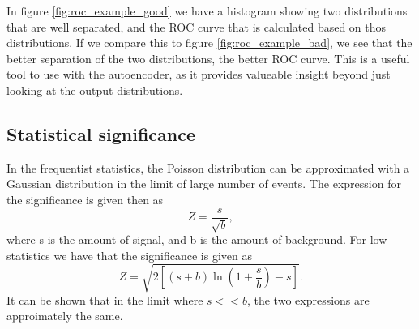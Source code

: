 In figure \ref{fig:roc_example_good} we have a histogram showing two distributions that are well separated, and the ROC curve that is calculated 
based on thos distributions. If we compare this to figure \ref{fig:roc_example_bad}, we see that the better separation of the two distributions, the better ROC curve. 
This is a useful tool to use with the autoencoder, as it provides valueable insight beyond just looking at the output distributions.

\subsection*{Statistical significance}
In the frequentist statistics, the Poisson distribution can be approximated with a Gaussian distribution in the limit of large number of events\cite{magnar}. 
The expression for the significance is given then as 
\begin{equation}\label{eq:significance_large}
    Z = \frac{s}{\sqrt{b}},
\end{equation}
where s is the amount of signal, and b is the amount of background. For low statistics we have that the significance is given as 
\begin{equation}\label{eq:significance_small}
    Z = \sqrt{2\left[(s+b)\ln(1+\frac{s}{b})-s\right]}.
\end{equation}
It can be shown that in the limit where $s << b$, the two expressions are approimately the same\cite{magnar}.